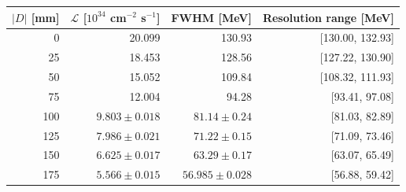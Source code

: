 \begin{tabular}{@{}rrrr@{}}
\toprule
$|D|$ [mm] & $\mathcal L$ [$10^{34}$ cm$^{-2}$ s$^{-1}$] & FWHM [MeV] & Resolution range [MeV]\\
\midrule
0 & 20.099 & 130.93 & [130.00, 132.93]\\
25 & 18.453 & 128.56 & [127.22, 130.90]\\
50 & 15.052 & 109.84 & [108.32, 111.93]\\
75 & 12.004 & 94.28 & [93.41, 97.08]\\
100 & $9.803\pm0.018$ & $81.14\pm0.24$ & [81.03, 82.89]\\
125 & $7.986\pm0.021$ & $71.22\pm0.15$ & [71.09, 73.46]\\
150 & $6.625\pm0.017$ & $63.29\pm0.17$ & [63.07, 65.49]\\
175 & $5.566\pm0.015$ & $56.985\pm0.028$ & [56.88, 59.42]\\
\bottomrule
\end{tabular}
